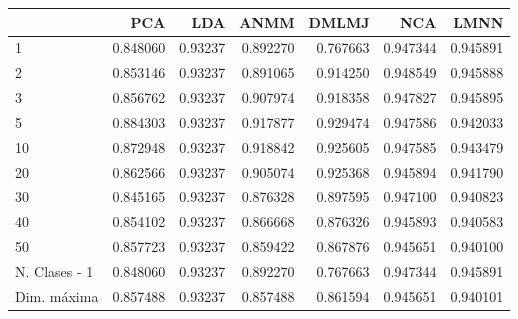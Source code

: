 \begin{tabular}{lrrrrrr}
\toprule
{} &       PCA &      LDA &      ANMM &     DMLMJ &       NCA &      LMNN \\
\midrule
1             &  0.848060 &  0.93237 &  0.892270 &  0.767663 &  0.947344 &  0.945891 \\
2             &  0.853146 &  0.93237 &  0.891065 &  0.914250 &  0.948549 &  0.945888 \\
3             &  0.856762 &  0.93237 &  0.907974 &  0.918358 &  0.947827 &  0.945895 \\
5             &  0.884303 &  0.93237 &  0.917877 &  0.929474 &  0.947586 &  0.942033 \\
10            &  0.872948 &  0.93237 &  0.918842 &  0.925605 &  0.947585 &  0.943479 \\
20            &  0.862566 &  0.93237 &  0.905074 &  0.925368 &  0.945894 &  0.941790 \\
30            &  0.845165 &  0.93237 &  0.876328 &  0.897595 &  0.947100 &  0.940823 \\
40            &  0.854102 &  0.93237 &  0.866668 &  0.876326 &  0.945893 &  0.940583 \\
50            &  0.857723 &  0.93237 &  0.859422 &  0.867876 &  0.945651 &  0.940100 \\
N. Clases - 1 &  0.848060 &  0.93237 &  0.892270 &  0.767663 &  0.947344 &  0.945891 \\
Dim. máxima   &  0.857488 &  0.93237 &  0.857488 &  0.861594 &  0.945651 &  0.940101 \\
\bottomrule
\end{tabular}
